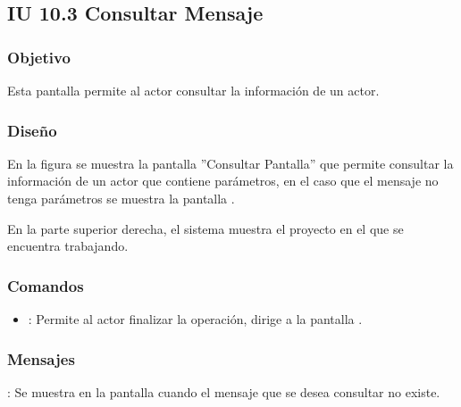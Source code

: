 \subsection{IU 10.3 Consultar Mensaje}

\subsubsection{Objetivo}
	Esta pantalla permite al actor consultar la información de un actor.
\subsubsection{Diseño}
	En la figura  se muestra la pantalla ''Consultar Pantalla'' que permite consultar la información de un actor que contiene parámetros, en el caso que el mensaje no tenga parámetros se muestra la pantalla .
	
	En la parte superior derecha, el sistema muestra el proyecto en el que se encuentra trabajando.

\subsubsection{Comandos}
\begin{itemize}
	\item {}: Permite al actor finalizar la operación, dirige a la pantalla .
\end{itemize}

\subsubsection{Mensajes}

\begin{Citemize}
	\item {}: Se muestra en la pantalla  cuando el mensaje que se desea consultar no existe.
\end{Citemize}
